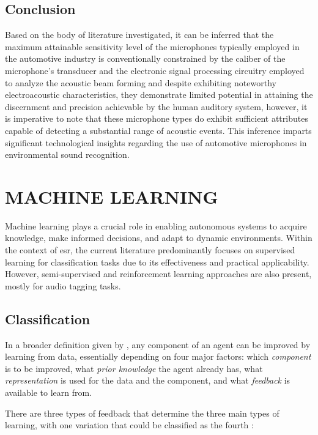 \subsection{Conclusion}
\label{subsec:microphones_conclusion}

Based on the body of literature investigated, it can be inferred that the maximum attainable sensitivity level of the microphones typically employed in the automotive industry is conventionally constrained by the caliber of the microphone's transducer and the electronic signal processing circuitry employed to analyze the acoustic beam forming and despite exhibiting noteworthy electroacoustic characteristics, they demonstrate limited potential in attaining the discernment and precision achievable by the human auditory system, however, it is imperative to note that these microphone types do exhibit sufficient attributes capable of detecting a substantial range of acoustic events. This inference imparts significant technological insights regarding the use of automotive microphones in environmental sound recognition.


\section{MACHINE LEARNING}
\label{sec:frmwk_machine_learning}

Machine learning plays a crucial role in enabling autonomous systems to acquire knowledge, make informed decisions, and adapt to dynamic environments. Within the context of \gls{esr}, the current literature predominantly focuses on supervised learning for classification tasks due to its effectiveness and practical applicability. However, semi-supervised and reinforcement learning approaches are also present, mostly for audio tagging tasks. 


\subsection{Classification}
\label{subsec:machine_learning_classification}

In a broader definition given by \textcite{Russel2010}, any component of an agent can be improved by learning from data, essentially depending on four major factors: which \textit{component} is to be improved, what \textit{prior knowledge} the agent already has, what \textit{representation} is used for the data and the component, and what \textit{feedback} is available to learn from.

There are three types of feedback that determine the three main types of learning, with one variation that could be classified as the fourth \cite{Russel2010}:

